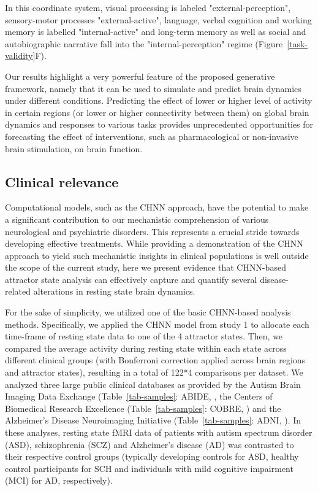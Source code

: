 \documentclass{article}
\begin{document}
In this coordinate system, visual processing is labeled "external-perception", sensory-motor processes
"external-active", language, verbal cognition and working memory is labelled "internal-active" and long-term memory
as well as social and autobiographic narrative fall into the "internal-perception" regime (Figure~\ref{task-validity}F).

Our results highlight a very powerful feature of the proposed generative framework, namely that it can be used to
simulate and predict brain dynamics under different conditions. Predicting the effect of lower or higher level of
activity in certain regions (or lower or higher connectivity between them) on global brain dynamics and responses to
various tasks provides unprecedented opportunities for forecasting the effect of interventions, such as pharmacological
or non-invasive brain stimulation, on brain function.

\subsection{Clinical relevance}\label{Clinical relevance}

Computational models, such as the CHNN approach, have the potential to make a significant contribution to our mechanistic comprehension of various neurological and psychiatric disorders. This represents a crucial stride towards developing effective treatments. While providing a demonstration of the CHNN approach to yield such mechanistic insights in clinical populations is well outside the scope of the current study, here we present evidence that CHNN-based attractor state analysis can effectively capture and quantify several disease-related alterations in resting state brain dynamics.

For the sake of simplicity, we utilized one of the basic CHNN-based analysis methods. Specifically, we applied the CHNN model from study 1 to allocate each time-frame of resting state data to one of the 4 attractor states. Then, we compared the average activity during resting state within each state across different clinical groups (with Bonferroni correction applied across brain regions and attractor states), resulting in a total of 122*4 comparisons per dataset. We analyzed three large public clinical databases as provided by the Autism Brain Imaging Data Exchange
(Table~\ref{tab-samples}: ABIDE, \citep{di2014autism}, the Centers of Biomedical Research Excellence
(Table~\ref{tab-samples}: COBRE, \citep{aine2017multimodal}) and the Alzheimer's Disease Neuroimaging Initiative
(Table~\ref{tab-samples}: ADNI, \citep{petersen2010alzheimer}).
In these analyses, resting state fMRI data of patients with autism spectrum disorder (ASD), schizophrenia (SCZ) and Alzheimer's disease
(AD) was contrasted to their respective control groups (typically developing controls for ASD, healthy control
participants for SCH and individuals with mild cognitive impairment (MCI) for AD, respectively).
\end{document}
